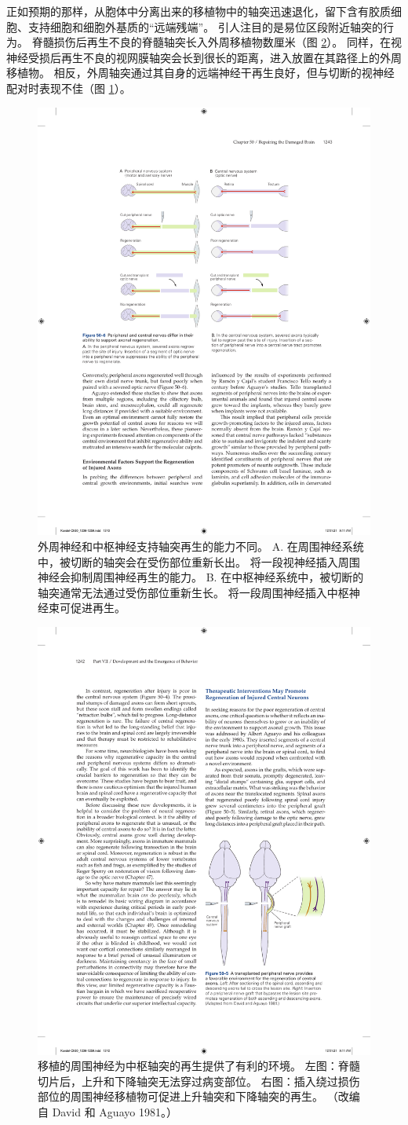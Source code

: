 正如预期的那样，从胞体中分离出来的移植物中的轴突迅速退化，留下含有胶质细胞、支持细胞和细胞外基质的“远端残端”。 引人注目的是易位区段附近轴突的行为。 脊髓损伤后再生不良的脊髓轴突长入外周移植物数厘米（图 \ref{fig:50_5}）。 
同样，在视神经受损后再生不良的视网膜轴突会长到很长的距离，进入放置在其路径上的外周移植物。 
相反，外周轴突通过其自身的远端神经干再生良好，但与切断的视神经配对时表现不佳（图 \ref{fig:50_6}）。

\begin{figure}[htbp]
	\centering
	\includegraphics[width=0.7\linewidth]{chap50/fig_50_6}
	\caption{外周神经和中枢神经支持轴突再生的能力不同。 A. 在周围神经系统中，被切断的轴突会在受伤部位重新长出。 将一段视神经插入周围神经会抑制周围神经再生的能力。 B. 在中枢神经系统中，被切断的轴突通常无法通过受伤部位重新生长。 将一段周围神经插入中枢神经束可促进再生。}
	\label{fig:50_6}
\end{figure}

\begin{figure}[htbp]
	\centering
	\includegraphics[width=0.5\linewidth]{chap50/fig_50_5}
	\caption{移植的周围神经为中枢轴突的再生提供了有利的环境。 左图：脊髓切片后，上升和下降轴突无法穿过病变部位。 右图：插入绕过损伤部位的周围神经移植物可促进上升轴突和下降轴突的再生。 （改编自 David 和 Aguayo 1981。）}
	\label{fig:50_5}
\end{figure}


